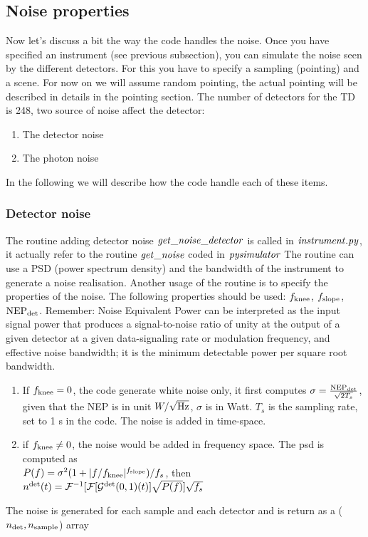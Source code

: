 \documentclass[a4paper, 11pt]{article}
\begin{document}
\subsection{Noise properties}

Now let's discuss a bit the way the code handles the noise.
Once you have specified an instrument (see previous subsection), you can simulate the noise seen by the different detectors. For this you have to specify a sampling (pointing) and a scene. For now on we will assume random pointing, the actual pointing will be described in details in the pointing section.
The number of detectors for the TD is 248, two source of noise affect the detector:
\begin{enumerate}
\item The detector noise
\item The photon noise
\end{enumerate}
In the following we will describe how the code handle each of these items.

\subsubsection{Detector noise}

The routine adding detector noise $\it{get\_noise\_detector}$ is called in $\it{instrument.py}$, it actually refer to the routine $\it{get\_noise}$  coded in $\it{pysimulator}$
The routine can use a PSD (power spectrum density) and the bandwidth of the instrument to generate a noise realisation.
Another usage of the routine is to specify the properties of the noise. The following properties should be used:  $ f_{\rm knee}$, $f_{\rm slope}$, ${\rm NEP}_{\rm det}$.
Remember: Noise Equivalent Power can be interpreted as the input signal
power that produces a signal-to-noise ratio of unity at the output of
a given detector at a given data-signaling rate or modulation
frequency, and effective noise bandwidth; it is the minimum
detectable power per square root bandwidth. 
\begin{enumerate}
\item If  $ f_{\rm knee}=0$, the code generate  white noise only, it first computes $\sigma=\frac{{\rm NEP}_{\rm det}}{\sqrt{2 T_s}}$, given that the NEP is in unit $W/\sqrt{\rm{Hz}}$, $\sigma$ is in Watt. $T_{s}$ is the sampling rate, set to 1 s in the code. The noise is added  in time-space.
\item if $ f_{\rm knee}\neq 0$, the noise would be added in frequency space. The psd is computed as  \\ $P(f)=\sigma^{2}(1+|f/f_{\rm knee} |^{f_{\rm slope}})/f_{s} $, then $n^{\rm det}(t)={ \cal F}^{-1}[ {\cal F}[{\cal G}^{\rm det}(0,1)(t)] \sqrt{P(f)}] \sqrt{f_{s}}$
\end{enumerate}
The noise is generated for each sample and each detector and is return as a ($n_{{\rm det}},n_{{\rm sample}}$) array
\end{document}
